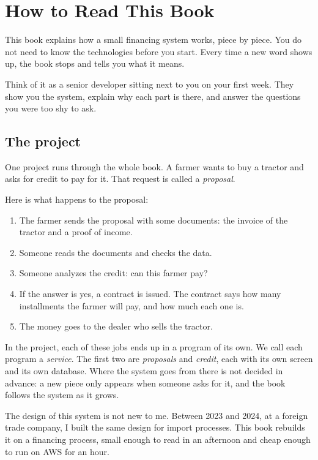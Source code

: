 \chapter*{How to Read This Book}

This book explains how a small financing system works, piece by piece. You do
not need to know the technologies before you start. Every time a new word
shows up, the book stops and tells you what it means.

Think of it as a senior developer sitting next to you on your first week. They
show you the system, explain why each part is there, and answer the questions
you were too shy to ask.

\section*{The project}

One project runs through the whole book. A farmer wants to buy a tractor and
asks for credit to pay for it. That request is called a \emph{proposal}.

Here is what happens to the proposal:

\begin{enumerate}
  \item The farmer sends the proposal with some documents: the invoice of the
        tractor and a proof of income.
  \item Someone reads the documents and checks the data.
  \item Someone analyzes the credit: can this farmer pay?
  \item If the answer is yes, a contract is issued. The contract says how many
        installments the farmer will pay, and how much each one is.
  \item The money goes to the dealer who sells the tractor.
\end{enumerate}

In the project, each of these jobs ends up in a program of its own. We call
each program a \emph{service}. The first two are \emph{proposals} and
\emph{credit}, each with its own screen and its own database. Where the
system goes from there is not decided in advance: a new piece only appears
when someone asks for it, and the book follows the system as it grows.

The design of this system is not new to me. Between 2023 and 2024, at a
foreign trade company, I built the same design for import processes. This
book rebuilds it on a financing process, small enough to read in an afternoon
and cheap enough to run on AWS for an hour.

